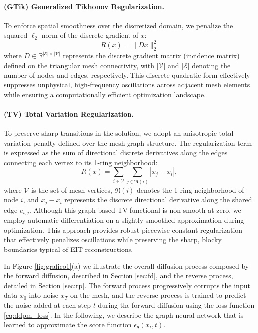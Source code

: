 \documentclass[a4paper,11pt]{article}
\renewcommand{\varepsilon}{\epsilon}
\theoremstyle{definition}
\theoremstyle{plain}
\theoremstyle{remark}
\begin{document}
\paragraph{(GTik)  Generalized Tikhonov Regularization.} 
To enforce spatial smoothness over the discretized domain, we penalize the squared $\ell_2$-norm of the discrete gradient of $x$:
\begin{equation}
R(x) = \|D x\|_2^2
\label{eq:regGT}
\end{equation}
where $D \in \mathbb{R}^{|\mathcal{E}| \times |\mathcal{V}|}$ represents the discrete gradient matrix (incidence matrix) defined on the triangular mesh connectivity, with $|\mathcal{V}|$ and $|\mathcal{E}|$ denoting the number of nodes and edges, respectively. This discrete quadratic form effectively suppresses unphysical, high-frequency oscillations across adjacent mesh elements while ensuring a computationally efficient optimization landscape.


\paragraph{(TV) Total Variation Regularization.} To preserve sharp transitions in the solution, we adopt an anisotropic total variation penalty defined over the mesh graph structure. The regularization term is expressed as the sum of directional discrete derivatives along the edges connecting each vertex to its 1-ring neighborhood:
\begin{equation}R(x) = \sum_{i \in \mathcal{V}} \sum_{j \in \mathfrak{N}(i)} |x_j - x_i|,\label{eq:regTV}
\end{equation}
where $\mathcal{V}$ is the set of mesh vertices, $\mathfrak{N}(i)$ denotes the 1-ring neighborhood of node $i$, and $x_j - x_i$ represents the discrete directional derivative along the shared edge $e_{i,j}$. Although this graph-based TV functional is non-smooth at zero, we employ automatic differentiation on a slightly smoothed approximation during optimization. This approach provides robust piecewise-constant regularization that effectively penalizes oscillations while preserving the sharp, blocky boundaries typical of EIT reconstructions.

    
\vspace{0.5cm}

In Figure \ref{fig:grafico1}(a) we illustrate the overall diffusion  process composed by the forward diffusion, described in Section \ref{sec:fd}, and the reverse process, detailed in Section \ref{sec:rp}.
The forward process progressively corrupts the input data $x_0$ into noise $x_T$ on the mesh, and
the reverse process is trained to predict the noise added at each step $t$ during the forward diffusion using the loss function \eqref{eq:ddpm_loss}. In the following, we describe the graph neural network that is learned to approximate the score function $\varepsilon_{\theta}(x_t, t)$.
\end{document}
